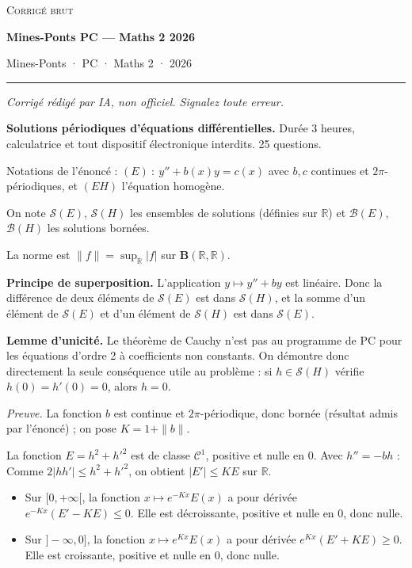 \documentclass[11pt,a4paper]{article}
\providecommand{\tightlist}{\setlength{\itemsep}{0pt}\setlength{\parskip}{0pt}}
\newcommand{\equationajustee}[1]{%
  \sbox{\boiteequation}{$\displaystyle #1$}%
  \ifdim\wd\boiteequation>\linewidth
    \[\resizebox{\linewidth}{!}{\usebox{\boiteequation}}\]%
  \else
    \[#1\]%
  \fi}
\begin{document}
\thispagestyle{plain}
\begin{center}
  {\small\scshape Corrigé brut}\par\smallskip
  {\LARGE\bfseries Mines-Ponts PC — Maths 2 2026\par}\medskip
  {\large Mines-Ponts · PC · Maths 2 · 2026\par}
\end{center}
\vspace{2pt}\hrule\vspace{8pt}

\emph{Corrigé rédigé par IA, non officiel. Signalez toute erreur.}

\textbf{Solutions périodiques d'équations différentielles.} Durée 3 heures, calculatrice et tout dispositif électronique interdits. 25 questions.

Notations de l'énoncé : \((E)\ :\ y''+b(x)y=c(x)\) avec \(b,c\) continues et \(2\pi\)-périodiques, et \((EH)\) l'équation homogène.

On note \(\mathcal S(E)\), \(\mathcal S(H)\) les ensembles de solutions (définies sur \(\mathbb R\)) et \(\mathcal B(E)\), \(\mathcal B(H)\) les solutions bornées.

La norme est \(\|f\|=\sup_{\mathbb R}|f|\) sur \(\mathbf B(\mathbb R,\mathbb R)\).

\textbf{Principe de superposition.} L'application \(y\mapsto y''+by\) est linéaire. Donc la différence de deux éléments de \(\mathcal S(E)\) est dans \(\mathcal S(H)\), et la somme d'un élément de \(\mathcal S(E)\) et d'un élément de \(\mathcal S(H)\) est dans \(\mathcal S(E)\).

\textbf{Lemme d'unicité.} Le théorème de Cauchy n'est pas au programme de PC pour les équations d'ordre 2 à coefficients non constants. On démontre donc directement la seule conséquence utile au problème : si \(h\in\mathcal S(H)\) vérifie \(h(0)=h'(0)=0\), alors \(h=0\).

\emph{Preuve.} La fonction \(b\) est continue et \(2\pi\)-périodique, donc bornée (résultat admis par l'énoncé) ; on pose \(K=1+\|b\|\).

La fonction \(E=h^2+h'^2\) est de classe \(\mathcal C^1\), positive et nulle en \(0\). Avec \(h''=-bh\) :
\equationajustee{\begin{aligned}
E'&=2hh'+2h'h''\\
&=2(1-b)hh'.
\end{aligned}}
Comme \(2|hh'|\le h^2+h'^2\), on obtient \(|E'|\le KE\) sur \(\mathbb R\).

\begin{itemize}
\tightlist
\item
  Sur \([0,+\infty[\), la fonction \(x\mapsto e^{-Kx}E(x)\) a pour dérivée \(e^{-Kx}(E'-KE)\le0\). Elle est décroissante, positive et nulle en \(0\), donc nulle.
\item
  Sur \(]-\infty,0]\), la fonction \(x\mapsto e^{Kx}E(x)\) a pour dérivée \(e^{Kx}(E'+KE)\ge0\). Elle est croissante, positive et nulle en \(0\), donc nulle.
\end{itemize}
\end{document}
